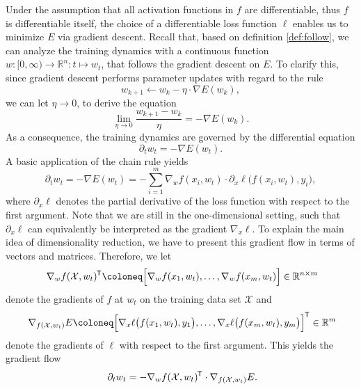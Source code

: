 \documentclass[11pt, a4paper]{article}
\newcommand{\R}{\mathbb{R}}
\newcommand{\X}{\mathcal{X}}
\newcommand*{\tr}{^{\mkern-1.5mu\mathsf{T}}}
\begin{document}
Under the assumption that all activation functions in $f$ are differentiable, thus $f$ is differentiable itself, the choice of a differentiable loss function $\ell$ enables us to minimize $E$ via gradient descent. Recall that, based on definition \ref{def:follow}, we can analyze the training dynamics with a continuous function $w : [0, \infty) \to \R^n : t \mapsto w_t$, that follows the gradient descent on $E$. To clarify this, since gradient descent performs parameter updates with regard to the rule
\[ w_{k+1} \leftarrow w_k - \eta \cdot \nabla E(w_k), \]
we can let $\eta \to 0$, to derive the equation
\[ \lim_{\eta \to 0} \frac{w_{k+1} - w_k}{\eta} = - \nabla E(w_k). \]
As a consequence, the training dynamics are governed by the differential equation
\[ \partial_tw_t = -\nabla E (w_t ). \]
A basic application of the chain rule yields
\[ \partial_t w_t = -\nabla E (w_t ) = - \sum_{i=1}^{m} \nabla_w f(x_i,w_t) \cdot \partial_x \ell \big ( f(x_i,w_t), y_i \big ), \]
where $\partial_x \ell$ denotes the partial derivative of the loss function with respect to the first argument. Note that we are still in the one-dimensional setting, such that $\partial_x \ell$ can equivalently be interpreted as the gradient $\nabla_x \ell$. To explain the main idea of dimensionality reduction, we have to present this gradient flow in terms of vectors and matrices. Therefore, we let
\[ \nabla_w f(\X, w_t)\tr \coloneq \Big [ \nabla_wf(x_1,w_t), \dots, \nabla_wf(x_m, w_t) \Big ] \in \R^{n \times m} \]
denote the gradients of $f$ at $w_t$ on the training data set $\X$ and
\[ \nabla_{f(\X,w_t)} E \coloneq \Big [ \nabla_x \ell \big ( f(x_1,w_t), y_1 \big ), \dots, \nabla_x \ell \big ( f(x_m,w_t), y_m \big ) \Big ]\tr \in \R^m \]
denote the gradients of $\ell$ with respect to the first argument. This yields the gradient flow
\[ \partial_tw_t = - \nabla_w f(\X, w_t)\tr \cdot \nabla_{f(\X,w_t)} E. \]
\end{document}
